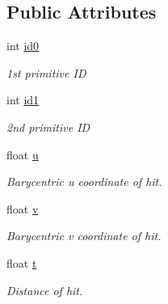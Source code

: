 \subsection*{Public Attributes}
\begin{DoxyCompactItemize}
\item 
\hypertarget{structembree_1_1_hit_addd61f0fde08e34373ca6e47ac64fed3}{
int \hyperlink{structembree_1_1_hit_addd61f0fde08e34373ca6e47ac64fed3}{id0}}
\label{structembree_1_1_hit_addd61f0fde08e34373ca6e47ac64fed3}

\begin{DoxyCompactList}\small\item\em 1st primitive ID \item\end{DoxyCompactList}\item 
\hypertarget{structembree_1_1_hit_a618ef28ba3fec6d7acd7e27d9fec96f5}{
int \hyperlink{structembree_1_1_hit_a618ef28ba3fec6d7acd7e27d9fec96f5}{id1}}
\label{structembree_1_1_hit_a618ef28ba3fec6d7acd7e27d9fec96f5}

\begin{DoxyCompactList}\small\item\em 2nd primitive ID \item\end{DoxyCompactList}\item 
\hypertarget{structembree_1_1_hit_afc2be6601a4486a876c4229b6309dca3}{
float \hyperlink{structembree_1_1_hit_afc2be6601a4486a876c4229b6309dca3}{u}}
\label{structembree_1_1_hit_afc2be6601a4486a876c4229b6309dca3}

\begin{DoxyCompactList}\small\item\em Barycentric u coordinate of hit. \item\end{DoxyCompactList}\item 
\hypertarget{structembree_1_1_hit_ad20a0be8854e264c5b1a9bc39931868f}{
float \hyperlink{structembree_1_1_hit_ad20a0be8854e264c5b1a9bc39931868f}{v}}
\label{structembree_1_1_hit_ad20a0be8854e264c5b1a9bc39931868f}

\begin{DoxyCompactList}\small\item\em Barycentric v coordinate of hit. \item\end{DoxyCompactList}\item 
\hypertarget{structembree_1_1_hit_a68c7369d0991d382eb5962a4001040a7}{
float \hyperlink{structembree_1_1_hit_a68c7369d0991d382eb5962a4001040a7}{t}}
\label{structembree_1_1_hit_a68c7369d0991d382eb5962a4001040a7}

\begin{DoxyCompactList}\small\item\em Distance of hit. \item\end{DoxyCompactList}\end{DoxyCompactItemize}


